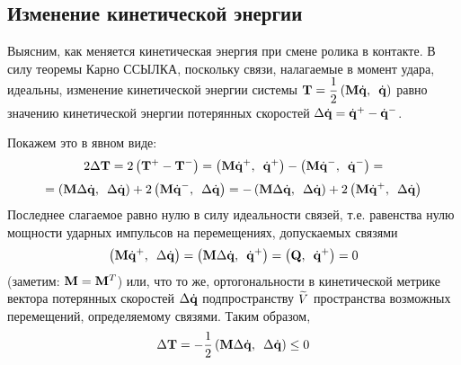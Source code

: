 
\subsection{Изменение кинетической энергии}
Выясним, как меняется кинетическая энергия при смене ролика в контакте.
В силу теоремы Карно ССЫЛКА, поскольку связи, налагаемые в момент удара, идеальны, изменение кинетической энергии системы $\eqTquad$ равно значению кинетической энергии потерянных скоростей $\deltadq = \dqposle - \dqdo$.

Покажем это в явном виде: 
$$
2\Delta\ke  =  2\left(\ke^+ - \ke^-\right) = \dotp{\mke\dqposle}{\dqposle} - \dotp{\mke\dqdo}{\dqdo} =
$$
$$
= \dotp{\mke\deltadq}{\deltadq} + 2\dotp{\mke\dqdo}{\deltadq} = -\dotp{\mke\deltadq}{\deltadq} + 2\dotp{\mke\dqposle}{\deltadq}
$$
Последнее слагаемое равно нулю в силу идеальности связей, т.е. равенства нулю мощности ударных импульсов на перемещениях, допускаемых связями
$$\logicWorkZero$$
(заметим: $\edMkeSim$) или, что то же, ортогональности в кинетической метрике вектора потерянных скоростей $\deltadq$ подпространству $\subspace$ пространства возможных перемещений, определяемому связями. Таким образом,
\begin{equation*}
\eqDeltaT
\end{equation*}
